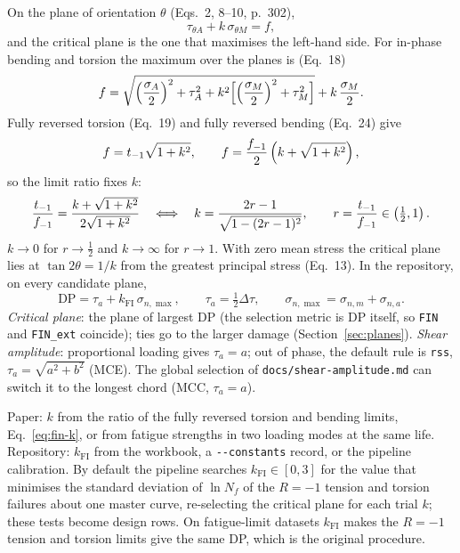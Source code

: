  On the plane of orientation $\theta$ (Eqs.~2, 8--10, p.~302),
\begin{equation}
\tau_{\theta A} + k\,\sigma_{\theta M} = f ,
\label{eq:fin-main}
\end{equation}
and the critical plane is the one that maximises the left-hand side. For in-phase bending and
torsion the maximum over the planes is (Eq.~18)
\begin{equation}
f = \sqrt{\Bigl(\frac{\sigma_A}{2}\Bigr)^2 + \tau_A^2 + k^2\Bigl[\Bigl(\frac{\sigma_M}{2}\Bigr)^2 + \tau_M^2\Bigr]} + k\,\frac{\sigma_M}{2} .
\label{eq:fin-eq18}
\end{equation}
Fully reversed torsion (Eq.~19) and fully reversed bending (Eq.~24) give
\begin{equation}
f = t_{-1}\sqrt{1+k^2},\qquad f = \frac{f_{-1}}{2}\left(k+\sqrt{1+k^2}\right),
\end{equation}
so the limit ratio fixes $k$:
\begin{equation}
\frac{t_{-1}}{f_{-1}} = \frac{k+\sqrt{1+k^2}}{2\sqrt{1+k^2}}
\quad\Longleftrightarrow\quad
k = \frac{2r-1}{\sqrt{1-(2r-1)^2}} ,\qquad r=\frac{t_{-1}}{f_{-1}}\in\left(\tfrac12,1\right).
\label{eq:fin-k}
\end{equation}
$k\to0$ for $r\to\tfrac12$ and $k\to\infty$ for $r\to1$. With zero mean stress the critical plane lies
at $\tan2\theta=1/k$ from the greatest principal stress (Eq.~13). In the repository, on every
candidate plane,
\begin{equation}
\mathrm{DP} = \tau_a + k_\mathrm{FI}\,\sigma_{n,\max},\qquad \tau_a=\tfrac12\Delta\tau,\qquad
\sigma_{n,\max}=\sigma_{n,m}+\sigma_{n,a} .
\label{eq:fin-dp}
\end{equation}
\emph{Critical plane}: the plane of largest DP (the selection metric is DP itself, so \texttt{FIN} and
\texttt{FIN\_ext} coincide); ties go to the larger damage (Section~\ref{sec:planes}).
\emph{Shear amplitude}: proportional loading gives $\tau_a=a$; out of phase, the default rule is
\texttt{rss}, $\tau_a=\sqrt{a^2+b^2}$ (MCE). The global selection of \texttt{docs/shear-amplitude.md}
can switch it to the longest chord (MCC, $\tau_a=a$).

 Paper: $k$ from the ratio of the fully reversed torsion and bending
limits, Eq.~\eqref{eq:fin-k}, or from fatigue strengths in two loading modes at the same life.
Repository: $k_\mathrm{FI}$ from the workbook, a \texttt{-{}-constants} record, or the pipeline
calibration. By default the pipeline searches $k_\mathrm{FI}\in[0,3]$ for the value that minimises
the standard deviation of $\ln N_f$ of the $R=-1$ tension and torsion failures about one master
curve, re-selecting the critical plane for each trial $k$; these tests become design rows. On
fatigue-limit datasets $k_\mathrm{FI}$ makes the $R=-1$ tension and torsion limits give the same DP,
which is the original procedure.

